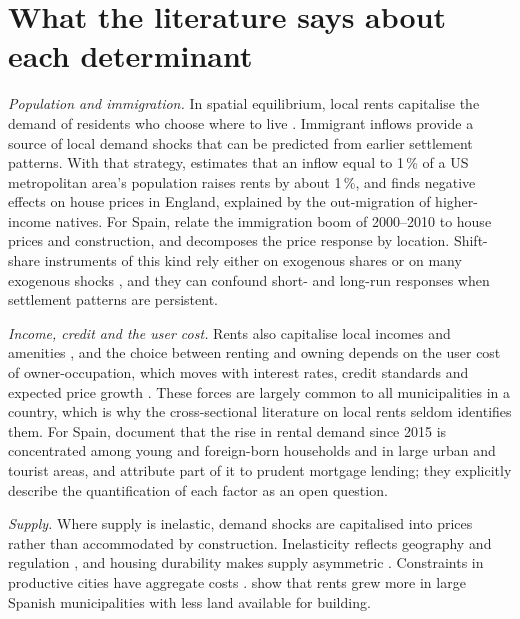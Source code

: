 \section{What the literature says about each determinant}\label{sec:lit}

\textit{Population and immigration.} In spatial equilibrium, local rents capitalise the demand of residents who choose where to live \citep{roback1982}. Immigrant inflows provide a source of local demand shocks that can be predicted from earlier settlement patterns. With that strategy, \citet{saiz2007} estimates that an inflow equal to 1\,\% of a US metropolitan area's population raises rents by about 1\,\%, and \citet{sa2015} finds negative effects on house prices in England, explained by the out-migration of higher-income natives. For Spain, \citet{gonzalez2013} relate the immigration boom of 2000--2010 to house prices and construction, and \citet{sanchis2023} decomposes the price response by location. Shift-share instruments of this kind rely either on exogenous shares or on many exogenous shocks \citep{goldsmith2020,borusyak2022,adao2019}, and they can confound short- and long-run responses when settlement patterns are persistent.

\textit{Income, credit and the user cost.} Rents also capitalise local incomes and amenities \citep{roback1982,gyourko2013}, and the choice between renting and owning depends on the user cost of owner-occupation, which moves with interest rates, credit standards and expected price growth \citep{poterba1984,himmelberg2005,sinai2005}. These forces are largely common to all municipalities in a country, which is why the cross-sectional literature on local rents seldom identifies them. For Spain, \citet{khametshin2024} document that the rise in rental demand since 2015 is concentrated among young and foreign-born households and in large urban and tourist areas, and attribute part of it to prudent mortgage lending; they explicitly describe the quantification of each factor as an open question.

\textit{Supply.} Where supply is inelastic, demand shocks are capitalised into prices rather than accommodated by construction. Inelasticity reflects geography \citep{saiz2010} and regulation \citep{glaeser2018,hilber2016,molloy2020}, and housing durability makes supply asymmetric \citep{glaeser2005}. Constraints in productive cities have aggregate costs \citep{hsieh2019}. \citet{khametshin2024} show that rents grew more in large Spanish municipalities with less land available for building.

